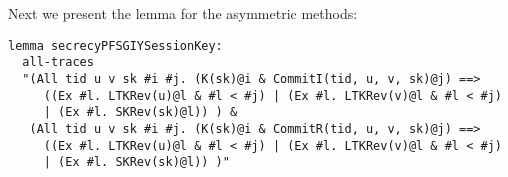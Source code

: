 Next we present the lemma for the asymmetric methods:
\begin{lstlisting}
lemma secrecyPFSGIYSessionKey:
  all-traces
  "(All tid u v sk #i #j. (K(sk)@i & CommitI(tid, u, v, sk)@j) ==>
     ((Ex #l. LTKRev(u)@l & #l < #j) | (Ex #l. LTKRev(v)@l & #l < #j)
     | (Ex #l. SKRev(sk)@l)) ) &
   (All tid u v sk #i #j. (K(sk)@i & CommitR(tid, u, v, sk)@j) ==>
     ((Ex #l. LTKRev(u)@l & #l < #j) | (Ex #l. LTKRev(v)@l & #l < #j)
     | (Ex #l. SKRev(sk)@l)) )"
\end{lstlisting}

